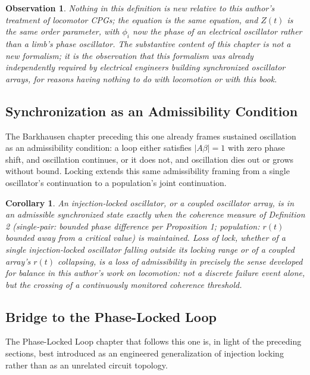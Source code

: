 \documentclass[12pt]{article}
\newtheorem{corollary}{Corollary}
\newtheorem{observation}{Observation}
\begin{document}
\begin{observation}
Nothing in this definition is new relative to this author's treatment of locomotor CPGs; the equation is the same equation, and $Z(t)$ is the same order parameter, with $\phi_i$ now the phase of an electrical oscillator rather than a limb's phase oscillator. The substantive content of this chapter is not a new formalism; it is the observation that this formalism was already independently required by electrical engineers building synchronized oscillator arrays, for reasons having nothing to do with locomotion or with this book.
\end{observation}

\subsection*{Synchronization as an Admissibility Condition}

The Barkhausen chapter preceding this one already frames sustained oscillation as an admissibility condition: a loop either satisfies $|A\beta|=1$ with zero phase shift, and oscillation continues, or it does not, and oscillation dies out or grows without bound. Locking extends this same admissibility framing from a single oscillator's continuation to a population's joint continuation.

\begin{corollary}
An injection-locked oscillator, or a coupled oscillator array, is in an admissible synchronized state exactly when the coherence measure of Definition 2 (single-pair: bounded phase difference per Proposition 1; population: $r(t)$ bounded away from a critical value) is maintained. Loss of lock, whether of a single injection-locked oscillator falling outside its locking range or of a coupled array's $r(t)$ collapsing, is a loss of admissibility in precisely the sense developed for balance in this author's work on locomotion: not a discrete failure event alone, but the crossing of a continuously monitored coherence threshold.
\end{corollary}

\subsection*{Bridge to the Phase-Locked Loop}

The Phase-Locked Loop chapter that follows this one is, in light of the preceding sections, best introduced as an engineered generalization of injection locking rather than as an unrelated circuit topology.
\end{document}
